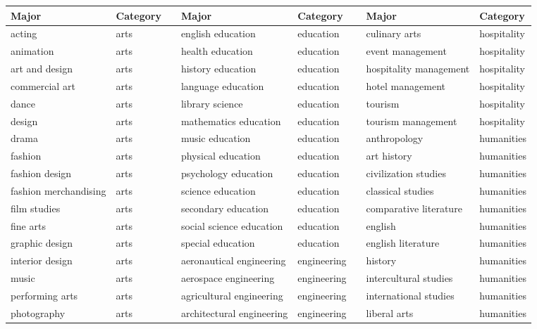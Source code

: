 \begin{table}[ht]
\centering
\tiny
\renewcommand{\arraystretch}{0.75} %
\setlength{\tabcolsep}{3pt} %
\begin{tabular}{ll p{0.5cm} ll p{0.5cm} ll}
\toprule
\textbf{Major} & \textbf{Category} && \textbf{Major} & \textbf{Category} && \textbf{Major} & \textbf{Category} \\
\midrule
acting & arts && english education & education && culinary arts & hospitality \\
animation & arts && health education & education && event management & hospitality \\
art and design & arts && history education & education && hospitality management & hospitality \\
commercial art & arts && language education & education && hotel management & hospitality \\
dance & arts && library science & education && tourism & hospitality \\
design & arts && mathematics education & education && tourism management & hospitality \\
drama & arts && music education & education && anthropology & humanities \\
fashion & arts && physical education & education && art history & humanities \\
fashion design & arts && psychology education & education && civilization studies & humanities \\
fashion merchandising & arts && science education & education && classical studies & humanities \\
film studies & arts && secondary education & education && comparative literature & humanities \\
fine arts & arts && social science education & education && english & humanities \\
graphic design & arts && special education & education && english literature & humanities \\
interior design & arts && aeronautical engineering & engineering && history & humanities \\
music & arts && aerospace engineering & engineering && intercultural studies & humanities \\
performing arts & arts && agricultural engineering & engineering && international studies & humanities \\
photography & arts && architectural engineering & engineering && liberal arts & humanities \\

\end{tabular}
\end{table}
